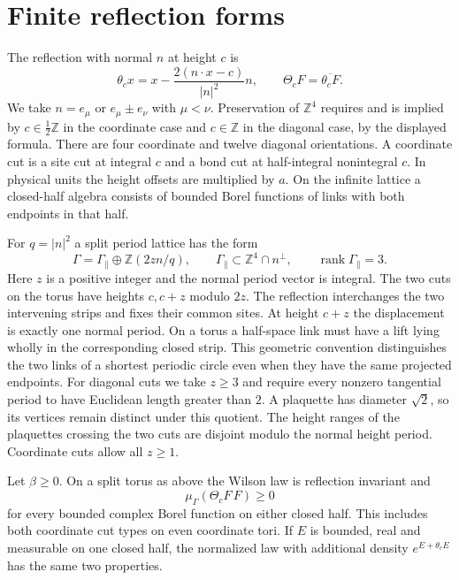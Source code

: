 \documentclass[11pt,letterpaper,reqno]{amsart}
\makeatletter
\numberwithin{equation}{section}
\theoremstyle{definition}
\newcommand{\ms@minorstart}{%
  \pushQED{\qed}\renewcommand{\qedsymbol}{$\blacksquare$}}
\newenvironment{proposition}[1][]{\ms@minorstart\ms@proposition[#1]}
  {\popQED\endms@proposition}
\theoremstyle{remark}
\makeatother
\begin{document}
\section{Finite reflection forms}\label{sec:lp-finite-rp}

The reflection with normal \(n\) at height \(c\) is
\[
 \theta_c x=x-\frac{2(n\cdot x-c)}{|n|^2}n,
 \qquad
 \Theta_cF=\overline{\theta_cF}.
\]
We take \(n=e_\mu\) or \(e_\mu\pm e_\nu\) with \(\mu<\nu\).
Preservation of \(\mathbb Z^4\) requires and is implied by
\(c\in\frac12\mathbb Z\) in the coordinate case and \(c\in\mathbb Z\)
in the diagonal case, by the displayed formula. There are four
coordinate and twelve diagonal orientations. A coordinate cut is a
site cut at integral \(c\) and a bond cut at half-integral nonintegral
\(c\). In physical units the height offsets are multiplied by \(a\).
On the infinite lattice a closed-half algebra consists of bounded
Borel functions of links with both endpoints in that half.

For \(q=|n|^2\) a split period lattice has the form
\begin{equation}\label{eq:lp-split}
 \Gamma=\Gamma_\parallel\oplus\mathbb Z(2zn/q),
 \qquad
 \Gamma_\parallel\subset\mathbb Z^4\cap n^\perp,
 \qquad \operatorname{rank}\Gamma_\parallel=3 .
\end{equation}
Here \(z\) is a positive integer and the normal period vector is
integral. The two cuts on the torus have heights \(c,c+z\) modulo
\(2z\). The reflection interchanges the two intervening strips and
fixes their common sites. At height \(c+z\) the displacement is
exactly one normal period. On a torus a half-space link must have
a lift lying wholly in the corresponding closed strip. This
geometric convention distinguishes the two links of a shortest
periodic circle even when they have the same projected endpoints.
For diagonal cuts we take \(z\ge3\) and require every nonzero
tangential period to have Euclidean length greater than \(2\).
A plaquette has diameter \(\sqrt2\), so its vertices remain distinct
under this quotient. The height ranges of the plaquettes crossing
the two cuts are disjoint modulo the normal height period.
Coordinate cuts allow all \(z\ge1\).

\begin{proposition}[Finite reflection positivity]\label{prop:lp-finite-rp}
Let \(\beta\ge0\). On a split torus as above the Wilson law is
reflection invariant and
\[
             \mu_\Gamma(\Theta_cF\,F)\ge0
\]
for every bounded complex Borel function on either closed half.
This includes both coordinate cut types on even coordinate tori.
If \(E\) is bounded, real and measurable on one closed half, the
normalized law with additional density \(e^{E+\theta_c E}\)
has the same two properties.
\end{proposition}
\end{document}
